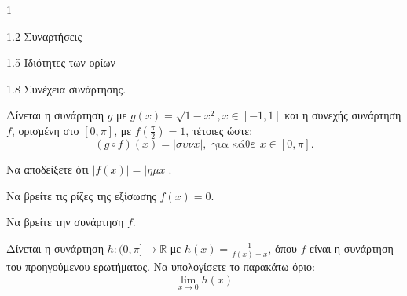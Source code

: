 \begin{ylh}{1}
    \item 1.2 Συναρτήσεις
    \item 1.5 Ιδιότητες των ορίων
    \item 1.8 Συνέχεια συνάρτησης.
\end{ylh}
Δίνεται η συνάρτηση $g$ με $g(x) = \sqrt{1-x^2}, x \in [-1,1]$ και η συνεχής συνάρτηση $f$, ορισμένη στο $[0, \pi]$, με $f\left(\frac{\pi}{2}\right) = 1$, τέτοιες ώστε:
\[ (g \circ f)(x) = |\sigma\upsilon\nu x|, \text{ για κάθε } x \in [0, \pi]. \]
\begin{alist}
    \item \leavevmode
    \begin{rlist}
        \item Να αποδείξετε ότι $|f(x)| = |\eta\mu x|$. 
        \item Να βρείτε τις ρίζες της εξίσωσης $f(x) = 0$. 
    \end{rlist}
    \item Να βρείτε την συνάρτηση $f$. 
    \item Δίνεται η συνάρτηση $h: (0, \pi] \to \mathbb{R}$ με $h(x) = \frac{1}{f(x) - x}$, όπου $f$ είναι η συνάρτηση του προηγούμενου ερωτήματος. Να υπολογίσετε το παρακάτω όριο:
    \[ \lim_{x \to 0} h(x) \] 
\end{alist}